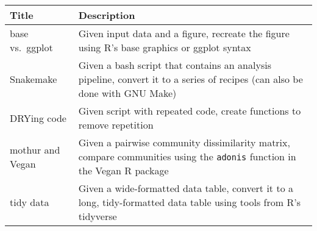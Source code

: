 \documentclass[
  11pt,
]{article}
\begin{document}
\begin{longtable}[]{@{}ll@{}}
\toprule
\begin{minipage}[b]{0.25\columnwidth}\raggedright
\textbf{Title}\strut
\end{minipage} & \begin{minipage}[b]{0.69\columnwidth}\raggedright
\textbf{Description}\strut
\end{minipage}\tabularnewline
\midrule
\endhead
\begin{minipage}[t]{0.25\columnwidth}\raggedright
base vs.~ggplot\strut
\end{minipage} & \begin{minipage}[t]{0.69\columnwidth}\raggedright
Given input data and a figure, recreate the figure using R's base
graphics or ggplot syntax\strut
\end{minipage}\tabularnewline
\begin{minipage}[t]{0.25\columnwidth}\raggedright
Snakemake\strut
\end{minipage} & \begin{minipage}[t]{0.69\columnwidth}\raggedright
Given a bash script that contains an analysis pipeline, convert it to a
series of recipes (can also be done with GNU Make)\strut
\end{minipage}\tabularnewline
\begin{minipage}[t]{0.25\columnwidth}\raggedright
DRYing code\strut
\end{minipage} & \begin{minipage}[t]{0.69\columnwidth}\raggedright
Given script with repeated code, create functions to remove
repetition\strut
\end{minipage}\tabularnewline
\begin{minipage}[t]{0.25\columnwidth}\raggedright
mothur and Vegan\strut
\end{minipage} & \begin{minipage}[t]{0.69\columnwidth}\raggedright
Given a pairwise community dissimilarity matrix, compare communities
using the \texttt{adonis} function in the Vegan R package\strut
\end{minipage}\tabularnewline
\begin{minipage}[t]{0.25\columnwidth}\raggedright
tidy data\strut
\end{minipage} & \begin{minipage}[t]{0.69\columnwidth}\raggedright
Given a wide-formatted data table, convert it to a long, tidy-formatted
data table using tools from R's tidyverse\strut
\end{minipage}\tabularnewline

\end{longtable}
\end{document}
